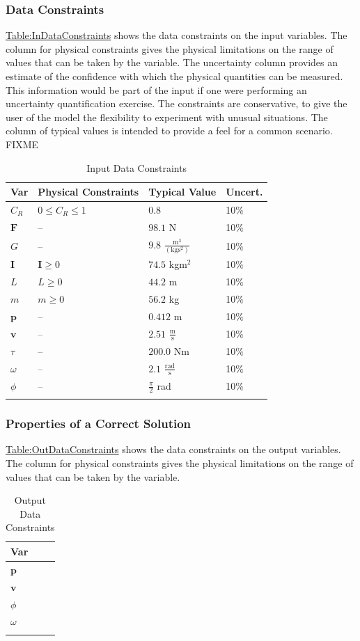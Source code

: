 \documentclass[12pt]{article}
\begin{document}
\subsubsection{Data Constraints}
\label{Sec:DataConstraints}
\hyperref[Table:InDataConstraints]{Table:InDataConstraints} shows the data constraints on the input variables. The column for physical constraints gives the physical limitations on the range of values that can be taken by the variable. The uncertainty column provides an estimate of the confidence with which the physical quantities can be measured. This information would be part of the input if one were performing an uncertainty quantification exercise. The constraints are conservative, to give the user of the model the flexibility to experiment with unusual situations. The column of typical values is intended to provide a feel for a common scenario. FIXME
\begin{longtable}{l l l l}
\toprule
\textbf{Var} & \textbf{Physical Constraints} & \textbf{Typical Value} & \textbf{Uncert.}
\\
\midrule
\endhead
${C_{R}}$ & $0\leq{}{C_{R}}\leq{}1$ & $0.8$ & 10$\%$
\\
$\mathbf{F}$ & -- & $98.1$ N & 10$\%$
\\
$G$ & -- & $9.8$ $\frac{\text{m}^{3}}{(\text{kg}\text{s}^{2})}$ & 10$\%$
\\
$\mathbf{I}$ & $\mathbf{I}\geq{}0$ & $74.5$ kg$\text{m}^{2}$ & 10$\%$
\\
$L$ & $L\geq{}0$ & $44.2$ m & 10$\%$
\\
$m$ & $m\geq{}0$ & $56.2$ kg & 10$\%$
\\
$\mathbf{p}$ & -- & $0.412$ m & 10$\%$
\\
$\mathbf{v}$ & -- & $2.51$ $\frac{\text{m}}{\text{s}}$ & 10$\%$
\\
$τ$ & -- & $200.0$ Nm & 10$\%$
\\
$ω$ & -- & $2.1$ $\frac{\text{rad}}{\text{s}}$ & 10$\%$
\\
$ϕ$ & -- & $\frac{π}{2}$ rad & 10$\%$
\\
\bottomrule
\caption{Input Data Constraints}
\label{Table:InDataConstraints}
\end{longtable}
\subsubsection{Properties of a Correct Solution}
\label{Sec:CorSolProps}
\hyperref[Table:OutDataConstraints]{Table:OutDataConstraints} shows the data constraints on the output variables. The column for physical constraints gives the physical limitations on the range of values that can be taken by the variable.
\begin{longtable}{l}
\toprule
\textbf{Var}
\\
\midrule
\endhead
$\mathbf{p}$
\\
$\mathbf{v}$
\\
$ϕ$
\\
$ω$
\\
\bottomrule
\caption{Output Data Constraints}
\label{Table:OutDataConstraints}
\end{longtable}
\end{document}
